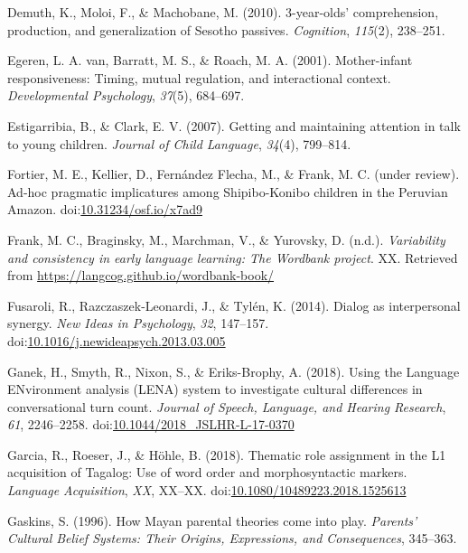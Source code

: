 \documentclass[floatsintext,man]{apa6}
\theoremstyle{definition}
\theoremstyle{definition}
\theoremstyle{definition}
\theoremstyle{remark}
\begin{document}
\hypertarget{ref-demuth2010three}{}
Demuth, K., Moloi, F., \& Machobane, M. (2010). 3-year-olds'
comprehension, production, and generalization of Sesotho passives.
\emph{Cognition}, \emph{115}(2), 238--251.

\hypertarget{ref-vanegeren2001mother}{}
Egeren, L. A. van, Barratt, M. S., \& Roach, M. A. (2001). Mother-infant
responsiveness: Timing, mutual regulation, and interactional context.
\emph{Developmental Psychology}, \emph{37}(5), 684--697.

\hypertarget{ref-estigarribia2007getting}{}
Estigarribia, B., \& Clark, E. V. (2007). Getting and maintaining
attention in talk to young children. \emph{Journal of Child Language},
\emph{34}(4), 799--814.

\hypertarget{ref-fortierURadhoc}{}
Fortier, M. E., Kellier, D., Fernández Flecha, M., \& Frank, M. C.
(under review). Ad-hoc pragmatic implicatures among Shipibo-Konibo
children in the Peruvian Amazon.
doi:\href{https://doi.org/10.31234/osf.io/x7ad9}{10.31234/osf.io/x7ad9}

\hypertarget{ref-frankIPvariability}{}
Frank, M. C., Braginsky, M., Marchman, V., \& Yurovsky, D. (n.d.).
\emph{Variability and consistency in early language learning: The
Wordbank project}. XX. Retrieved from
\url{https://langcog.github.io/wordbank-book/}

\hypertarget{ref-fusaroli2014synergy}{}
Fusaroli, R., Razczaszek-Leonardi, J., \& Tylén, K. (2014). Dialog as
interpersonal synergy. \emph{New Ideas in Psychology}, \emph{32},
147--157.
doi:\href{https://doi.org/10.1016/j.newideapsych.2013.03.005}{10.1016/j.newideapsych.2013.03.005}

\hypertarget{ref-ganek2018using}{}
Ganek, H., Smyth, R., Nixon, S., \& Eriks-Brophy, A. (2018). Using the
Language ENvironment analysis (LENA) system to investigate cultural
differences in conversational turn count. \emph{Journal of Speech,
Language, and Hearing Research}, \emph{61}, 2246--2258.
doi:\href{https://doi.org/10.1044/2018_JSLHR-L-17-0370}{10.1044/2018\_JSLHR-L-17-0370}

\hypertarget{ref-garcia2018thematic}{}
Garcia, R., Roeser, J., \& Höhle, B. (2018). Thematic role assignment in
the L1 acquisition of Tagalog: Use of word order and morphosyntactic
markers. \emph{Language Acquisition}, \emph{XX}, XX--XX.
doi:\href{https://doi.org/10.1080/10489223.2018.1525613}{10.1080/10489223.2018.1525613}

\hypertarget{ref-gaskins1996how}{}
Gaskins, S. (1996). How Mayan parental theories come into play.
\emph{Parents' Cultural Belief Systems: Their Origins, Expressions, and
Consequences}, 345--363.
\end{document}
